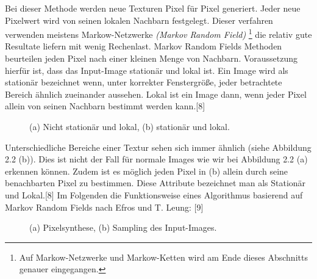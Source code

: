 \documentclass[12pt]{report}
\begin{document}
Bei dieser Methode werden neue Texturen Pixel für Pixel generiert.
Jeder neue Pixelwert wird von seinen lokalen Nachbarn festgelegt.
Dieser verfahren verwenden meistens Markow-Netzwerke \textit{(Markov Random Field)}
\footnote[1]{Auf Markow-Netzwerke und Markow-Ketten wird am Ende dieses Abschnitts genauer eingegangen.}
die relativ gute Resultate liefern mit wenig Rechenlast.
Markov Random Fields Methoden beurteilen jeden Pixel nach einer kleinen Menge von Nachbarn.
Voraussetzung hierfür ist, dass das Input-Image stationär und lokal ist.
Ein Image wird als stationär bezeichnet wenn, unter korrekter Fenstergröße,
jeder betrachtete Bereich ähnlich zueinander aussehen.
Lokal ist ein Image dann, wenn jeder Pixel allein von seinen Nachbarn bestimmt werden kann.{[8]}

\begin{figure}[H]
    \centering
    \qquad
    \caption{(a) Nicht stationär und lokal, (b) stationär und lokal.}%
\end{figure}

Unterschiedliche Bereiche einer Textur sehen sich immer ähnlich {(siehe Abbildung 2.2 (b))}.
Dies ist nicht der Fall für normale Images wie wir bei Abbildung 2.2 {(a)} erkennen können.
Zudem ist es möglich jeden Pixel in {(b)} allein durch seine benachbarten Pixel zu bestimmen.
Diese Attribute bezeichnet man als Stationär und Lokal.{[8]}
Im Folgenden die Funktionsweise eines Algorithmus basierend auf Markov Random Fields nach Efros und T. Leung: {[9]}

\begin{figure}[H]
    \centering
    \qquad
    \caption{(a) Pixelsynthese, (b) Sampling des Input-Images.}%
\end{figure}
\end{document}
